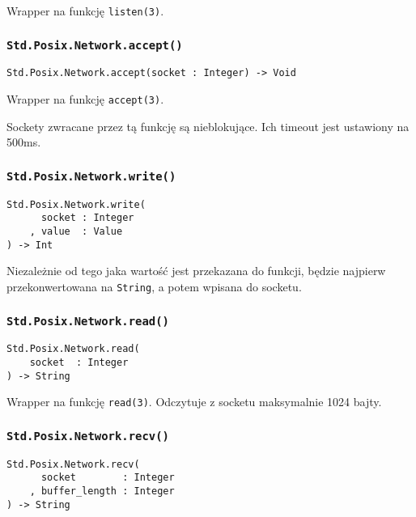 Wrapper na funkcję \texttt{listen(3)}.

\subsubsection{\texttt{Std.Posix.Network.accept()}}

\begin{small}
\begin{lstlisting}
Std.Posix.Network.accept(socket : Integer) -> Void
\end{lstlisting}
\end{small}

Wrapper na funkcję \texttt{accept(3)}.

Sockety zwracane przez tą funkcję są nieblokujące. Ich timeout jest ustawiony na 500ms.

\subsubsection{\texttt{Std.Posix.Network.write()}}

\begin{small}
\begin{lstlisting}
Std.Posix.Network.write(
      socket : Integer
    , value  : Value
) -> Int
\end{lstlisting}
\end{small}

Niezależnie od tego jaka wartość jest przekazana do funkcji, będzie najpierw przekonwertowana na
\texttt{String}, a potem wpisana do socketu.

\subsubsection{\texttt{Std.Posix.Network.read()}}

\begin{small}
\begin{lstlisting}
Std.Posix.Network.read(
    socket  : Integer
) -> String
\end{lstlisting}
\end{small}

Wrapper na funkcję \texttt{read(3)}. Odczytuje z socketu maksymalnie 1024 bajty.

\subsubsection{\texttt{Std.Posix.Network.recv()}}

\begin{small}
\begin{lstlisting}
Std.Posix.Network.recv(
      socket        : Integer
    , buffer_length : Integer
) -> String
\end{lstlisting}
\end{small}

